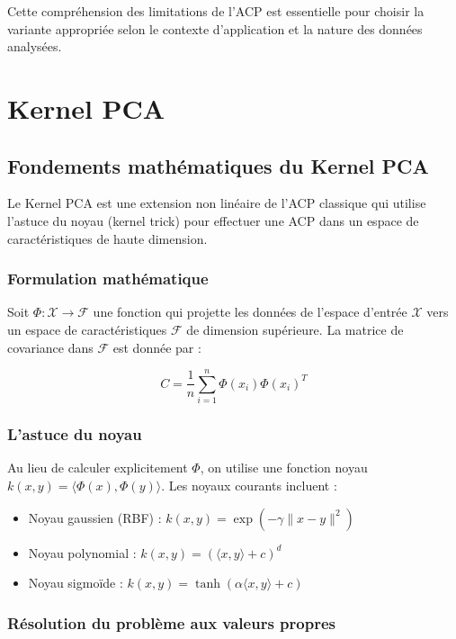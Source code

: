 \documentclass[a4paper,12pt]{report}
\begin{document}
Cette compréhension des limitations de l'ACP est essentielle pour choisir la variante appropriée selon le contexte d'application et la nature des données analysées.

\newpage
\appendix
\chapter{Kernel PCA}
\label{annexe:kernel_pca}

\section{Fondements mathématiques du Kernel PCA}

Le Kernel PCA est une extension non linéaire de l'ACP classique qui utilise l'astuce du noyau (kernel trick) pour effectuer une ACP dans un espace de caractéristiques de haute dimension.

\subsection{Formulation mathématique}

Soit $\Phi : \mathcal{X} \rightarrow \mathcal{F}$ une fonction qui projette les données de l'espace d'entrée $\mathcal{X}$ vers un espace de caractéristiques $\mathcal{F}$ de dimension supérieure. La matrice de covariance dans $\mathcal{F}$ est donnée par :

\[
C = \frac{1}{n}\sum_{i=1}^n \Phi(x_i)\Phi(x_i)^T
\]

\subsection{L'astuce du noyau}

Au lieu de calculer explicitement $\Phi$, on utilise une fonction noyau $k(x,y) = \langle \Phi(x), \Phi(y) \rangle$. Les noyaux courants incluent :

\begin{itemize}
  \item Noyau gaussien (RBF) : $k(x,y) = \exp(-\gamma\|x-y\|^2)$
  \item Noyau polynomial : $k(x,y) = (\langle x,y \rangle + c)^d$
  \item Noyau sigmoïde : $k(x,y) = \tanh(\alpha\langle x,y \rangle + c)$
\end{itemize}

\subsection{Résolution du problème aux valeurs propres}
\end{document}
